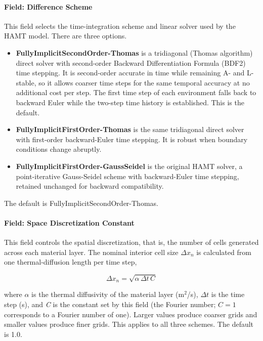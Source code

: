 \paragraph{Field: Difference Scheme}\label{field-difference-scheme-hamt}

This field selects the time-integration scheme and linear solver used by the HAMT model. There are three options.

\begin{itemize}
    \item
    \textbf{FullyImplicitSecondOrder-Thomas} is a tridiagonal (Thomas algorithm) direct solver with second-order Backward Differentiation Formula (BDF2) time stepping. It is second-order accurate in time while remaining A- and L-stable, so it allows coarser time steps for the same temporal accuracy at no additional cost per step. The first time step of each environment falls back to backward Euler while the two-step time history is established. This is the default.
    \item
    \textbf{FullyImplicitFirstOrder-Thomas} is the same tridiagonal direct solver with first-order backward-Euler time stepping. It is robust when boundary conditions change abruptly.
    \item
    \textbf{FullyImplicitFirstOrder-GaussSeidel} is the original HAMT solver, a point-iterative Gauss-Seidel scheme with backward-Euler time stepping, retained unchanged for backward compatibility.
\end{itemize}

The default is FullyImplicitSecondOrder-Thomas.

\paragraph{Field: Space Discretization Constant}\label{field-space-discretization-constant-hamt}

This field controls the spatial discretization, that is, the number of cells generated across each material layer. The nominal interior cell size \(\Delta x_n\) is calculated from one thermal-diffusion length per time step,

\begin{equation}
    \Delta x_n = \sqrt {\alpha \, \Delta t \, C}
\end{equation}

where \(\alpha\) is the thermal diffusivity of the material layer (m\(^{2}\)/s), \(\Delta t\) is the time step (s), and \emph{C} is the constant set by this field (the Fourier number; \(C = 1\) corresponds to a Fourier number of one). Larger values produce coarser grids and smaller values produce finer grids. This applies to all three schemes. The default is 1.0.

